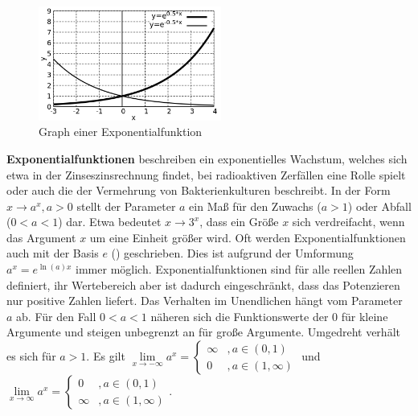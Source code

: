\begin{minipage}[t]{1\textwidth}
    \begin{figure}
        \centering
        \includegraphics[width=6cm]{./gnuplot/base-function-expo}
        \caption{Graph einer Exponentialfunktion}
        \label{fig:ExBaseFunExpo}
    \end{figure}
    \textbf{Exponentialfunktionen} beschreiben ein exponentielles Wachstum, welches sich etwa in der Zinseszinsrechnung findet, bei radioaktiven Zerfällen eine Rolle spielt oder auch die der Vermehrung von Bakterienkulturen beschreibt. In der Form $x \to a^x, a>0$ stellt der Parameter $a$ ein Maß für den Zuwachs ($a>1$) oder Abfall ($0<a<1$) dar. Etwa bedeutet $x \to 3^x$, dass ein Größe $x$ sich verdreifacht, wenn das Argument $x$ um eine Einheit größer wird. Oft werden Exponentialfunktionen auch mit der Basis $e$ () geschrieben. Dies ist aufgrund der Umformung $a^x = e^{\ln(a)x}$ immer möglich. Exponentialfunktionen sind für alle reellen Zahlen definiert, ihr Wertebereich aber ist dadurch eingeschränkt, dass das Potenzieren nur positive Zahlen liefert. Das Verhalten im Unendlichen hängt vom Parameter $a$ ab. Für den Fall $0<a<1$ näheren sich die Funktionswerte der $0$ für kleine Argumente und steigen unbegrenzt an für große Argumente. Umgedreht verhält es sich für $a>1$. Es gilt $\lim\limits_{x\to-\infty} a^x = \begin{cases} \infty & , a \in (0,1)  \\ 0 & , a \in (1, \infty) \end{cases}$ und $\lim\limits_{x\to\infty} a^x = \begin{cases} 0 & , a \in (0,1)  \\ \infty & , a \in (1, \infty) \end{cases}$.
\end{minipage}

